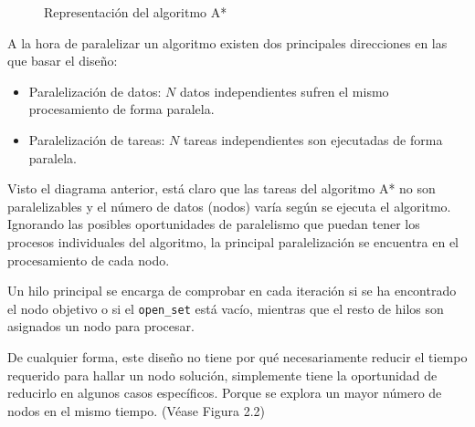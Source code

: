 \begin{figure}
\begin{center}
\end{center}
\caption{Representación del algoritmo A*}
\end{figure}

A la hora de paralelizar un algoritmo existen dos principales direcciones
en las que basar el diseño:
\begin{itemize}[itemsep=0.25px]
    \item Paralelización de datos: $N$ datos independientes sufren el mismo procesamiento de forma paralela.
    \item Paralelización de tareas: $N$ tareas independientes son ejecutadas de forma paralela.
\end{itemize}

Visto el diagrama anterior, está claro que las tareas del algoritmo A* no son paralelizables
y el número de datos (nodos) varía según se ejecuta el algoritmo.
Ignorando las posibles oportunidades de paralelismo que puedan tener los procesos
individuales del algoritmo, la principal paralelización se encuentra en el
procesamiento de cada nodo.

Un hilo principal se encarga de comprobar en cada iteración si se ha encontrado
el nodo objetivo o si el \lstinline{open_set} está vacío,
mientras que el resto de hilos son asignados un nodo para procesar.

De cualquier forma, este diseño no tiene por qué necesariamente reducir el tiempo
requerido para hallar un nodo solución, simplemente tiene la oportunidad de reducirlo
en algunos casos específicos.
Porque se explora un mayor número de nodos en el mismo tiempo.
(Véase Figura 2.2)

